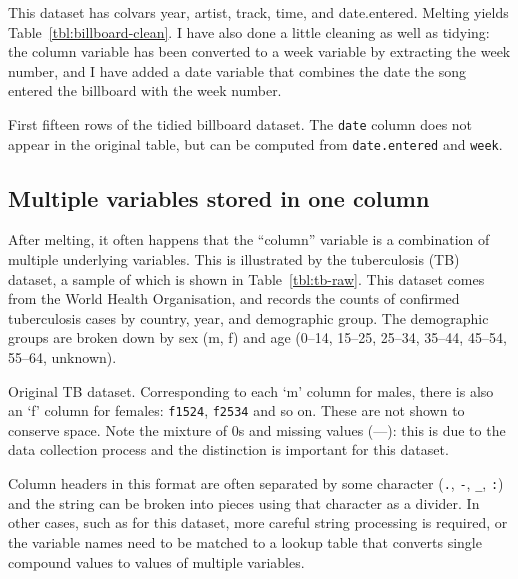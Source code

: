 \documentclass[article]{jss}
\begin{document}
This dataset has colvars year, artist, track, time, and date.entered. Melting yields Table~\ref{tbl:billboard-clean}. I have also done a little cleaning as well as tidying: the column variable has been converted to a week variable by extracting the week number, and I have added a date variable that combines the date the song entered the billboard with the week number.

\begin{table}[htbp]
  \centering
  
  \caption{First fifteen rows of the tidied billboard dataset. The {\tt date} column does not appear in the original table, but can be computed from {\tt date.entered} and {\tt week}.}
  \label{tbl:billboard-clean}
\end{table}

\subsection{Multiple variables stored in one column}

After melting, it often happens that the ``column'' variable is a combination of multiple underlying variables. This is illustrated by the tuberculosis (TB) dataset, a sample of which is shown in Table~\ref{tbl:tb-raw}. This dataset comes from the World Health Organisation, and records the counts of confirmed tuberculosis cases by country, year, and demographic group. The demographic groups are broken down by sex (m, f) and age (0--14, 15--25, 25--34, 35--44, 45--54, 55--64, unknown). 

\begin{table}[htbp]
  \centering
  
  \caption{Original TB dataset. Corresponding to each `m' column for males, there is also an `f' column for females: {\tt f1524}, {\tt f2534} and so on. These are not shown to conserve space. Note the mixture of 0s and missing values (---): this is due to the data collection process and the distinction is important for this dataset.}
  \label{tbl:tb-raw}
\end{table}

Column headers in this format are often separated by some character ({\tt .}, {\tt -}, {\tt \_}, {\tt :}) and the string can be broken into pieces using that character as a divider. In other cases, such as for this dataset, more careful string processing is required, or the variable names need to be matched to a lookup table that converts single compound values to values of multiple variables. 
\end{document}
